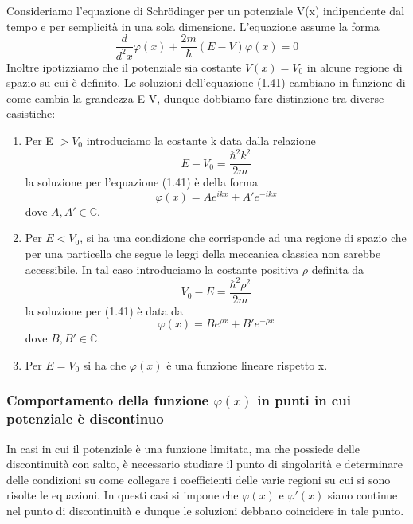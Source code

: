  Consideriamo l'equazione di Schr\"odinger per un potenziale V(x) indipendente dal tempo e per semplicit\`a in una sola dimensione. L'equazione assume la forma 
 \begin{equation}
 	\frac{d}{d^2x}\varphi(x) + \frac{2m}{\hbar}(E-V)\varphi(x) = 0
 \end{equation}
Inoltre ipotizziamo che il potenziale sia costante $V(x) = V_0$ in alcune regione di spazio su cui \`e definito. Le soluzioni dell'equazione (1.41) cambiano in funzione di come cambia la grandezza E-V, dunque dobbiamo fare distinzione tra diverse casistiche:
\begin{enumerate}
	\item Per E  $ >V_0$ introduciamo la costante k data dalla relazione
	\begin{equation*}
		E-V_0 = \frac{\hbar^2 k^2}{2m}
	\end{equation*} 
	la soluzione per l'equazione (1.41) \`e della forma 
	\begin{equation*}
		\varphi(x) = Ae^{ikx}+A'e^{-ikx}
	\end{equation*}
	dove $A,A' \in \mathbb{C}$.
	\item Per $E < V_0$, si ha una condizione che corrisponde ad una regione di spazio che per una particella che segue le leggi della meccanica classica non sarebbe accessibile. In tal caso introduciamo la costante positiva $\rho$ definita da 
	\begin{equation*}
		V_0 - E = \frac{\hbar^2 \rho^2}{2m}
	\end{equation*}
	la soluzione per (1.41) \`e data da 
	\begin{equation*}
		\varphi(x) = Be^{\rho x} + B'e^{-\rho x}
	\end{equation*}
	dove $B,B' \in \mathbb{C}$.
	\item Per $E = V_0$ si ha che $\varphi(x)$ \`e una funzione lineare rispetto x.
\end{enumerate}

\subsubsection{Comportamento della funzione $\varphi(x)$  in punti in cui potenziale \`e discontinuo}

In casi in cui il potenziale \`e una funzione limitata, ma che possiede delle discontinuit\`a con salto, \`e necessario studiare il punto di singolarit\`a e determinare delle condizioni su come collegare i coefficienti delle varie regioni su cui si sono risolte le equazioni. In questi casi si impone che $\varphi(x)$ e $\varphi'(x)$ siano continue nel punto di discontinuit\`a e dunque le soluzioni debbano coincidere in tale punto.

